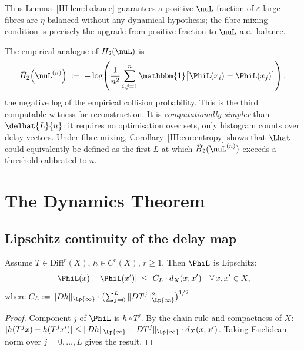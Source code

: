 Thus Lemma~\ref{III:lem:balance} guarantees a positive $\nuL$-fraction of
$\varepsilon$-large fibres are $\eta$-balanced without any dynamical hypothesis;
the fibre mixing condition is precisely the upgrade from positive-fraction to
$\nuL$-a.e.\ balance.

\begin{remark}
\label{III:rem:entropy-witness}
The empirical analogue of $H_2(\nuL)$ is
\[
  \hat{H}_2\!\left(\nuL^{(n)}\right)
  \;:=\;
  -\log\!\left(\frac{1}{n^2}\sum_{i,j=1}^n
    \mathbbm{1}\bigl[\PhiL(x_i) = \PhiL(x_j)\bigr]\right),
\]
the negative log of the empirical collision probability.
This is the third computable witness for reconstruction.
It is \emph{computationally simpler} than $\delhat{L}{n}$: it requires no
optimisation over sets, only histogram counts over delay vectors.
Under fibre mixing, Corollary~\ref{III:cor:entropy} shows that $\Lhat$ could
equivalently be defined as the first $L$ at which $\hat{H}_2(\nuL^{(n)})$
exceeds a threshold calibrated to $n$.
\end{remark}

\section{The Dynamics Theorem}
\label{III:sec:dynamics}

\subsection{Lipschitz continuity of the delay map}

\begin{lemma}
\label{III:lem:upper-lip}
Assume $T \in \mathrm{Diff}^r(X)$, $h \in C^r(X)$, $r \geq 1$.
Then $\PhiL$ is Lipschitz:
\[
  |\PhiL(x) - \PhiL(x')| \;\leq\; C_L \cdot d_X(x,x')
  \quad\forall\, x, x' \in X,
\]
where $C_L := \|Dh\|_{\Lp{\infty}} \cdot \bigl(\sum_{j=0}^{L}
\|DT^j\|_{\Lp{\infty}}^2\bigr)^{1/2}$.
\end{lemma}

\begin{proof}
Component $j$ of $\PhiL$ is $h \circ T^j$.
By the chain rule and compactness of $X$:
$|h(T^j x) - h(T^j x')| \leq \|Dh\|_{\Lp{\infty}} \cdot \|DT^j\|_{\Lp{\infty}} \cdot d_X(x,x')$.
Taking Euclidean norm over $j = 0, \ldots, L$ gives the result.
\end{proof}

